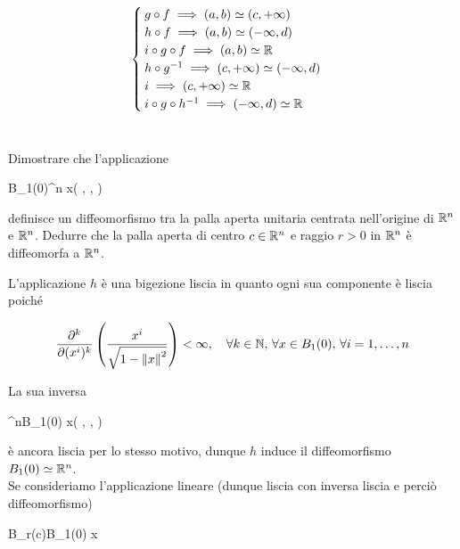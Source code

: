 \begin{equation}
	\begin{cases}
		g \circ f \implies (a,b) \simeq (c,+\infty)\\
		h \circ f \implies (a,b) \simeq (-\infty,d)\\
		i \circ g \circ f \implies (a,b) \simeq \mathbb{R}\\
		h \circ g^{-1} \implies (c,+\infty) \simeq (-\infty,d)\\
		i \implies (c,+\infty) \simeq \mathbb{R}\\
		i \circ g \circ h^{-1} \implies (-\infty,d) \simeq \mathbb{R}
	\end{cases}
\end{equation}

\tocless\section{}\label{es1-4}

\begin{tcolorbox}
	Dimostrare che l'applicazione
	
		{B_{1}(0)}{\R^{n}}%
		{x}{\left( , \cdots,  \right)}
	
	definisce un diffeomorfismo tra la palla aperta unitaria centrata nell'origine di $ \mathbb{R}^{n} $ e $ \mathbb{R}^{n} $. Dedurre che la palla aperta di centro $ c \in \mathbb{R}^{n} $ e raggio $ r > 0 $ in $ \mathbb{R}^{n} $ è diffeomorfa a $ \mathbb{R}^{n} $.
\end{tcolorbox}

L'applicazione $ h $ è una bigezione liscia in quanto ogni sua componente è liscia poiché

\begin{equation}
	\pdv[k]{(x^{i})} \left( \dfrac{x^{i}}{\sqrt{ 1-\norm{x}^{2} }} \right) < \infty \qcomma \forall k \in \N, \, \forall x \in B_{1}(0), \, \forall i=1,\dots,n
\end{equation}

La sua inversa

%
	{\R^{n}}{B_{1}(0)}%
	{x}{\left( , \cdots,  \right)}
	
è ancora liscia per lo stesso motivo, dunque $ h $ induce il diffeomorfismo $ B_{1}(0) \simeq \mathbb{R}^{n} $.\\
Se consideriamo l'applicazione lineare (dunque liscia con inversa liscia e perciò diffeomorfismo)

%
	{B_{r}(c)}{B_{1}(0)}%
	{x}{}
	
